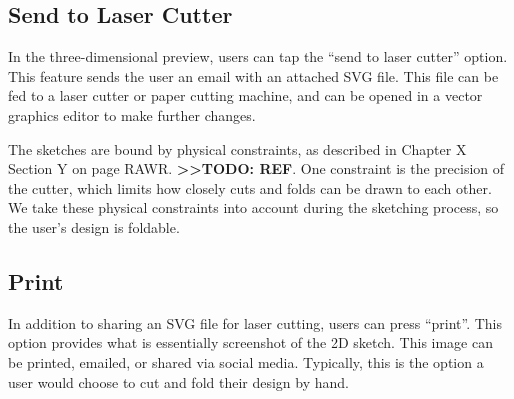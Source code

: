 \subsection{Send to Laser Cutter}\label{send-to-laser-cutter}

In the three-dimensional preview, users can tap the ``send to laser
cutter'' option. This feature sends the user an email with an attached
SVG file. This file can be fed to a laser cutter or paper cutting
machine, and can be opened in a vector graphics editor to make further
changes.

The sketches are bound by physical constraints, as described in Chapter
X Section Y on page RAWR. \textbf{\textgreater{}\textgreater{}TODO:
REF}. One constraint is the precision of the cutter, which limits how
closely cuts and folds can be drawn to each other. We take these
physical constraints into account during the sketching process, so the
user's design is foldable.

\subsection{Print}\label{print}

In addition to sharing an SVG file for laser cutting, users can press
``print''. This option provides what is essentially screenshot of the 2D
sketch. This image can be printed, emailed, or shared via social media.
Typically, this is the option a user would choose to cut and fold their
design by hand.

